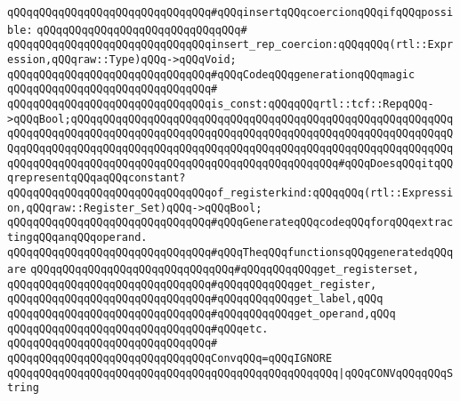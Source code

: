 \verb|qQQqqQQqqQQqqQQqqQQqqQQqqQQqqQQq#qQQqinsertqQQqcoercionqQQqifqQQqpossible:|\newline
\verb|qQQqqQQqqQQqqQQqqQQqqQQqqQQqqQQq#|\newline
\verb|qQQqqQQqqQQqqQQqqQQqqQQqqQQqqQQqinsert_rep_coercion:qQQqqQQq(rtl::Expression,qQQqraw::Type)qQQq->qQQqVoid;|\newline
\newline
\newline
\verb|qQQqqQQqqQQqqQQqqQQqqQQqqQQqqQQq#qQQqCodeqQQqgenerationqQQqmagic|\newline
\verb|qQQqqQQqqQQqqQQqqQQqqQQqqQQqqQQq#|\newline
\verb|qQQqqQQqqQQqqQQqqQQqqQQqqQQqqQQqis_const:qQQqqQQqrtl::tcf::RepqQQq->qQQqBool;qQQqqQQqqQQqqQQqqQQqqQQqqQQqqQQqqQQqqQQqqQQqqQQqqQQqqQQqqQQqqQQqqQQqqQQqqQQqqQQqqQQqqQQqqQQqqQQqqQQqqQQqqQQqqQQqqQQqqQQqqQQqqQQqqQQqqQQqqQQqqQQqqQQqqQQqqQQqqQQqqQQqqQQqqQQqqQQqqQQqqQQqqQQqqQQqqQQqqQQqqQQqqQQqqQQqqQQqqQQqqQQqqQQqqQQqqQQqqQQqqQQqqQQqqQQq#qQQqDoesqQQqitqQQqrepresentqQQqaqQQqconstant?|\newline
\newline
\verb|qQQqqQQqqQQqqQQqqQQqqQQqqQQqqQQqof_registerkind:qQQqqQQq(rtl::Expression,qQQqraw::Register_Set)qQQq->qQQqBool;|\newline
\newline
\newline
\verb|qQQqqQQqqQQqqQQqqQQqqQQqqQQqqQQq#qQQqGenerateqQQqcodeqQQqforqQQqextractingqQQqanqQQqoperand.|\newline
\verb|qQQqqQQqqQQqqQQqqQQqqQQqqQQqqQQq#qQQqTheqQQqfunctionsqQQqgeneratedqQQqare|\newline
\verb|qQQqqQQqqQQqqQQqqQQqqQQqqQQqqQQq#qQQqqQQqqQQqget_registerset,|\newline
\verb|qQQqqQQqqQQqqQQqqQQqqQQqqQQqqQQq#qQQqqQQqqQQqget_register,|\newline
\verb|qQQqqQQqqQQqqQQqqQQqqQQqqQQqqQQq#qQQqqQQqqQQqget_label,qQQq|\newline
\verb|qQQqqQQqqQQqqQQqqQQqqQQqqQQqqQQq#qQQqqQQqqQQqget_operand,qQQq|\newline
\verb|qQQqqQQqqQQqqQQqqQQqqQQqqQQqqQQq#qQQqetc.|\newline
\verb|qQQqqQQqqQQqqQQqqQQqqQQqqQQqqQQq#|\newline
\verb|qQQqqQQqqQQqqQQqqQQqqQQqqQQqqQQqConvqQQq=qQQqIGNORE|\newline
\verb|qQQqqQQqqQQqqQQqqQQqqQQqqQQqqQQqqQQqqQQqqQQqqQQqqQQq|\verb#|qQQqCONVqQQqqQQqString#\newline
